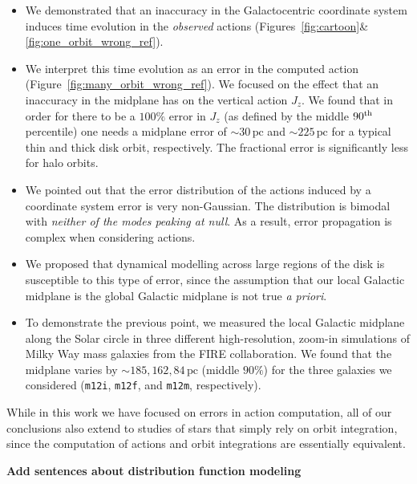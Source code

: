 \documentclass[twocolumn]{aastex62}
\newcommand{\pc}{\text{pc}}
\newcommand{\mi}{\texttt{m12i}}
\newcommand{\mf}{\texttt{m12f}}
\newcommand{\mm}{\texttt{m12m}}
\newcommand{\uth}{\textsuperscript{th}}
\begin{document}
\begin{itemize}
\item We demonstrated that an inaccuracy in the Galactocentric coordinate
system induces time evolution in the {\em observed} actions
(Figures~\ref{fig:cartoon}\&\ref{fig:one_orbit_wrong_ref}). 

\item We interpret this time evolution as an error in the computed action
(Figure~\ref{fig:many_orbit_wrong_ref}). We focused on the effect that an
inaccuracy in the midplane has on the vertical action $J_z$. We found that in
order for there to be a $100\%$ error in $J_z$ (as defined by the middle
$90\uth$ percentile) one needs a midplane error of $\sim30\,\pc$ and
$\sim225\,\pc$ for a typical thin and thick disk orbit, respectively. The
fractional error is significantly less for halo orbits.

\item We pointed out that the error distribution of the actions induced by a
coordinate system error is very non-Gaussian. The distribution is bimodal with
{\em neither of the modes peaking at 
     null}. 
As a result, error
propagation is 
     complex
when considering actions.

\item We proposed that dynamical modelling across large regions of the disk is
susceptible to this type of error, since the assumption that our local
Galactic midplane is the global Galactic midplane is not true {\em a priori}.

\item To demonstrate the previous point, we measured the local Galactic
midplane along the Solar circle in three different high-resolution, zoom-in
simulations of Milky Way mass galaxies from the FIRE collaboration. We found
that the midplane varies by $\sim185, 162, 84\,\pc$ (middle $90\%$) for the
three galaxies we considered (\mi{}, \mf{}, and \mm{}, respectively).

\end{itemize}

While in this work we have focused on errors in action computation, all of our
conclusions also extend to studies of stars that simply rely on orbit
integration, since the computation of actions and orbit integrations are
essentially equivalent.

{\bf Add sentences about distribution function modeling}
\end{document}
